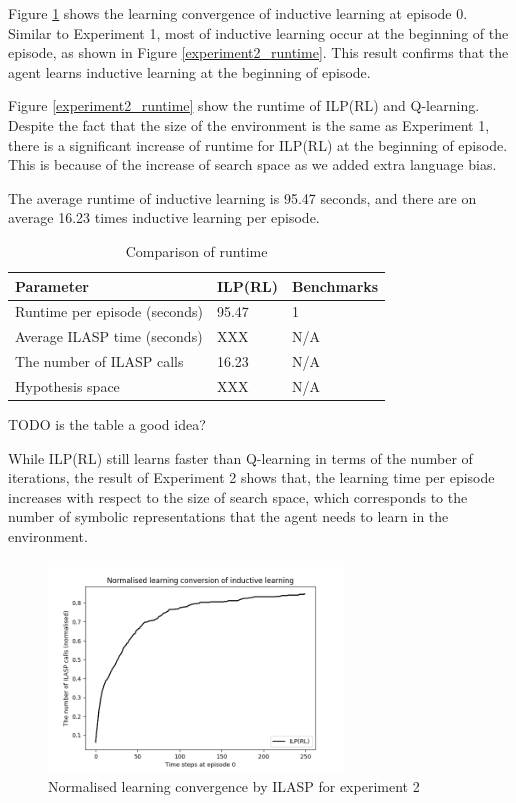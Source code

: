Figure \ref{experiment2_ilasp} shows the learning convergence of inductive learning at episode 0.
Similar to Experiment 1, most of inductive learning occur at the beginning of the episode, as shown in Figure \ref{experiment2_runtime}. 
This result confirms that the agent learns inductive learning at the beginning of episode.

Figure \ref{experiment2_runtime} show the runtime of ILP(RL) and Q-learning. 
Despite the fact that the size of the environment is the same as Experiment 1, 
there is a significant increase of runtime for ILP(RL) at the beginning of episode. 
This is because of the increase of search space as we added extra language bias.

The average runtime of inductive learning is 95.47 seconds, and there are on average 16.23 times inductive learning per episode.

\begin{table}[!ht!b]
\centering
\begin{tabular}{lll}
\hline
Parameter            & ILP(RL)    & Benchmarks      \\ \hline
Runtime per episode (seconds) & 95.47        & 1        \\
Average ILASP time (seconds)& XXX        & N/A        \\
The number of ILASP calls &  16.23      & N/A       \\
Hypothesis space &  XXX      & N/A       \\
\end{tabular}
\caption{Comparison of runtime}
\label{param}
\end{table}
TODO is the table a good idea?

While ILP(RL) still learns faster than Q-learning in terms of the number of iterations, 
the result of Experiment 2 shows that, the learning time per episode increases with respect to the size of search space, 
which corresponds to the number of symbolic representations that the agent needs to learn in the environment.

\begin{figure}[!htb]
\centering
\includegraphics[width=0.7\textwidth]{./figures/experiment2_ilasp}
\caption{Normalised learning convergence by ILASP for experiment 2}
\label{experiment2_ilasp}
\end{figure}


